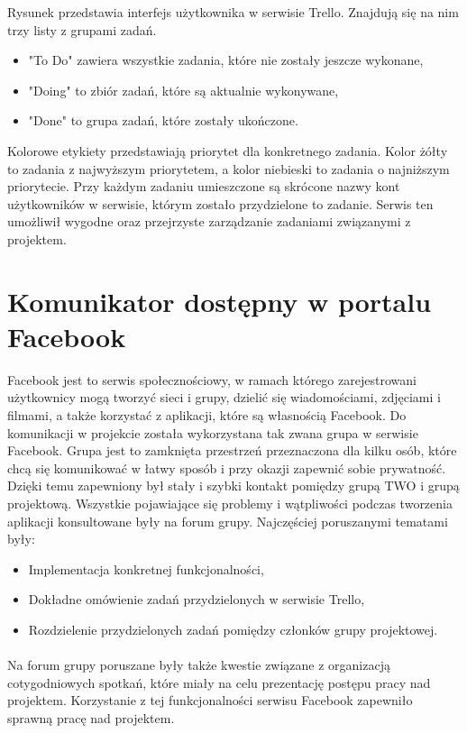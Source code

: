 Rysunek przedstawia interfejs użytkownika w serwisie Trello. Znajdują się na nim trzy listy z grupami zadań.

\begin{itemize}
\item "To Do" zawiera wszystkie zadania, które nie zostały jeszcze wykonane,
\item "Doing" to zbiór zadań, które są aktualnie wykonywane,
\item "Done" to grupa zadań, które zostały ukończone.
\end{itemize}


Kolorowe etykiety przedstawiają priorytet dla konkretnego zadania. Kolor żółty to zadania z najwyższym priorytetem, a kolor niebieski to zadania o najniższym priorytecie. Przy każdym zadaniu umieszczone są skrócone nazwy kont użytkowników w serwisie, którym zostało przydzielone to zadanie. 
Serwis ten umożliwił wygodne oraz przejrzyste zarządzanie zadaniami związanymi z projektem.

\section{Komunikator dostępny w portalu Facebook}
Facebook jest to serwis społecznościowy, w ramach którego zarejestrowani użytkownicy mogą tworzyć sieci i grupy, dzielić się wiadomościami, zdjęciami i filmami, a także korzystać z aplikacji, które są własnością Facebook. Do komunikacji w projekcie została wykorzystana tak zwana grupa w serwisie Facebook. Grupa  jest to zamknięta przestrzeń przeznaczona dla kilku osób, które chcą się komunikować w łatwy sposób i przy okazji zapewnić sobie prywatność. Dzięki temu zapewniony był stały i szybki kontakt pomiędzy grupą TWO i grupą projektową. Wszystkie pojawiające się problemy i wątpliwości podczas tworzenia aplikacji konsultowane były na forum grupy. Najczęściej poruszanymi tematami były:

\begin{itemize}
\item Implementacja konkretnej funkcjonalności,
\item Dokładne omówienie zadań przydzielonych w serwisie Trello,
\item Rozdzielenie przydzielonych zadań pomiędzy członków grupy projektowej.
\end{itemize}
\paragraph{}


Na forum grupy poruszane były także kwestie związane z organizacją cotygodniowych spotkań, które miały na celu prezentację postępu pracy nad projektem. Korzystanie z tej funkcjonalności serwisu Facebook zapewniło sprawną pracę nad projektem. 
